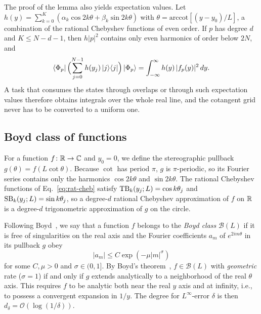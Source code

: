 The proof of the lemma also yields expectation values.  Let
$h(y)=\sum_{k=0}^{K}(\alpha_k\cos 2k\theta+\beta_k\sin 2k\theta)$
with $\theta=\mathrm{arccot}[(y-y_0)/L]$, a combination of the
rational Chebyshev functions of even order.  If $p$ has degree $d$
and $K\le N-d-1$, then $h|p|^2$ contains only even harmonics of
order below $2N$, and
\begin{equation}
	\bra{\Phi_p}\Bigl(\sum_{j=0}^{N-1}h(y_j)\ket{j}\!\bra{j}\Bigr)
	\ket{\Phi_p}
	=\int_{-\infty}^{\infty}h(y)\,|f_p(y)|^2\,dy .
	\label{eq:expectation}
\end{equation}
A task that consumes the states through overlaps or through such
expectation values therefore obtains integrals over the whole real
line, and the cotangent grid never has to be converted to a uniform
one.

\subsection{Boyd class of functions}
\label{subsec:boyd}

For a function $f\colon\mathbb{R}\to\mathbb{C}$ and $y_0=0$, we define the
stereographic pullback $g(\theta)=f(L\cot\theta)$.  Because $\cot$ has period $\pi$, $g$ is
$\pi$-periodic, so its Fourier series contains only the harmonics
$\cos 2k\theta$ and $\sin 2k\theta$.  The rational Chebyshev
functions of Eq.~\eqref{eq:rat-cheb} satisfy
$\mathrm{TB}_k(y_j;L)=\cos k\theta_j$ and $\mathrm{SB}_k(y_j;L)=\sin k\theta_j$, so
a degree-$d$ rational Chebyshev approximation of $f$ on $\mathbb{R}$ is a
degree-$d$ trigonometric approximation of $g$ on the circle.

Following Boyd~\cite{Boyd1990}, we say that a function $f$ belongs
to the \emph{Boyd class} $\mathcal{B}(L)$ if it is free of
singularities on the real axis and the Fourier coefficients $a_m$
of $e^{2im\theta}$ in its pullback $g$ obey
\begin{equation}
	|a_m|\le C\exp(-\mu|m|^\sigma)
	\label{eq:boyd-bound}
\end{equation}
for some $C,\mu>0$ and $\sigma\in(0,1]$.  By Boyd's
theorem~\cite{Boyd1990}, $f\in\mathcal{B}(L)$ with
\emph{geometric} rate ($\sigma=1$) if and only if $g$ extends
analytically to a neighborhood of the real $\theta$ axis.  This
requires $f$ to be analytic both near the real $y$ axis and at
infinity, i.e., to possess a convergent expansion in $1/y$.  The
degree for $L^\infty$-error $\delta$ is then
$d_\delta=\mathcal{O}(\log(1/\delta))$.

